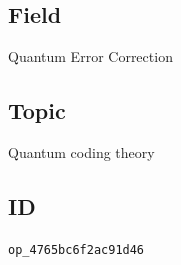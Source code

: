 \subsection*{Field}

Quantum Error Correction

\subsection*{Topic}

Quantum coding theory

\subsection*{ID}

\texttt{op\_4765bc6f2ac91d46}
